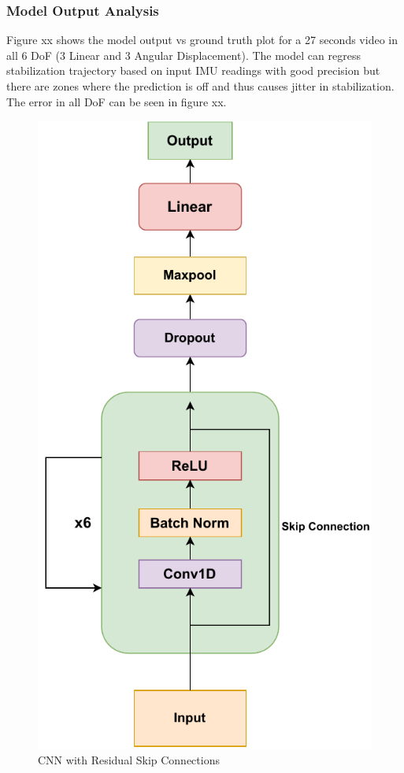 \subsubsection{Model Output Analysis}
Figure xx shows the model output vs ground truth plot for a 27 seconds video in all 6 DoF (3 Linear and 3 Angular Displacement). The model can regress stabilization trajectory based on input IMU readings with good precision but there are zones where the prediction is off and thus causes jitter in stabilization. The error in all DoF can be seen in figure xx.

\begin{figure}
    \centering
    \includegraphics{images/fig_chapter2/nns/resnet_mt.pdf}
    \caption{CNN with Residual Skip Connections}
    \label{fig:resnet_used}
\end{figure}

